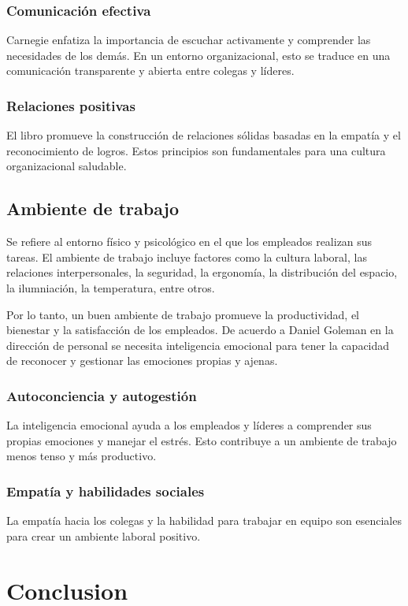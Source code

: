 \documentclass[journal]{IEEEtran}
\begin{document}
\subsubsection{Comunicación efectiva}
Carnegie enfatiza la importancia de escuchar activamente y comprender las necesidades de los demás. En un entorno organizacional, esto se traduce en una comunicación transparente y abierta entre colegas y líderes.

\subsubsection{Relaciones positivas}
El libro promueve la construcción de relaciones sólidas basadas en la empatía y el reconocimiento de logros. Estos principios son fundamentales para una cultura organizacional saludable.

\subsection{Ambiente de trabajo}
Se refiere al entorno físico y psicológico en el que los empleados realizan sus tareas. El ambiente de trabajo incluye factores como la cultura laboral, las relaciones interpersonales, la seguridad, la ergonomía, la distribución del espacio, la ilumniación, la temperatura, entre otros.

Por lo tanto, un buen ambiente de trabajo promueve la productividad, el bienestar y la satisfacción de los empleados. De acuerdo a Daniel Goleman en la dirección de personal se necesita inteligencia emocional para tener la capacidad de reconocer y gestionar las emociones propias y ajenas.

\subsubsection{Autoconciencia y autogestión}
La inteligencia emocional ayuda a los empleados y líderes a comprender sus propias emociones y manejar el estrés. Esto contribuye a un ambiente de trabajo menos tenso y más productivo.

\subsubsection{Empatía y habilidades sociales}
La empatía hacia los colegas y la habilidad para trabajar en equipo son esenciales para crear un ambiente laboral positivo.

\section{Conclusion}
\end{document}
